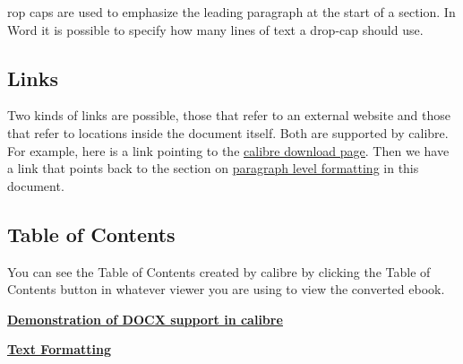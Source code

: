 \documentclass[\officeparserdriver 12pt]{article}
\begin{document}
{\par}

rop caps are used to emphasize the leading paragraph at the start of a section. In Word it is possible to specify how many lines of text a drop-cap should use.

\subsection[{Links}]{\protect\textcolor{hex4F81BD}{Links}}\label{_Toc1233048813}\label{links}

{\hspace*{21.6bp}Two kinds of links are possible, those that refer to an external website and those that refer to locations inside the document itself. Both are supported by calibre. For example, here is a link pointing to the \href{http://calibre-ebook.com/download}{\textcolor{hex0000FF}{\uline{calibre download page}}}. Then we have a link that points back to the section on \hyperref[_Paragraph_level_formatting]{\textcolor{hex0000FF}{\uline{paragraph level formatting}}} in this document.\par}

\subsection[{Table of Contents}]{\protect\textcolor{hex4F81BD}{Table of Contents}}\label{_Toc64145348}\label{table-of-contents}

{\hspace*{21.6bp}You can see the Table of Contents created by calibre by clicking the Table of Contents button in whatever viewer you are using to view the converted ebook.\par}

{\hspace*{21.6bp}\hyperref[_Toc581531977]{\textcolor{hex0000FF}{\uline{\textbf{{\fontsize{10pt}{12pt}\selectfont Demonstration of DOCX support in calibre}}}} \textcolor{hex0000FF}{\uline{\textbf{{\fontsize{10pt}{12pt}}}}}}\par}

{\hspace*{21.6bp}\hyperref[_Toc2054249818]{\textcolor{hex0000FF}{\uline{\textbf{{\fontsize{10pt}{12pt}\selectfont Text Formatting}}}} \textcolor{hex0000FF}{\uline{\textbf{{\fontsize{10pt}{12pt}}}}}}\par}
\end{document}
